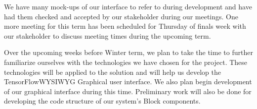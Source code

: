 \documentclass[journal,10pt,onecolumn,compsoc]{IEEEtran} \usepackage[margin=1.0in]{geometry} \usepackage{pdfpages}
\begin{document}
\noindent We have many mock-ups of our interface to refer to during development and have had them checked and accepted by our stakeholder during our meetings.
One more meeting for this term has been scheduled for Thursday of finals week with our stakeholder to discuss meeting times during the upcoming term.

\noindent Over the upcoming weeks before Winter term, we plan to take the time to further familiarize ourselves with the technologies we have chosen for the project.
These technologies will  be applied to the solution and will help us develop the TensorFlow\texttrademark WYSIWYG Graphical user interface.
We also plan begin development of our graphical interface during this time.
Preliminary work will also be done for developing the code structure of our system's Block components.
\end{document}
